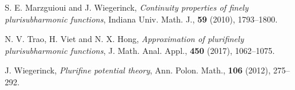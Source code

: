 \documentclass[3p,times]{elsarticle}
\numberwithin{equation}{section}
\newtheorem{The main theorem}[theorem]{The main theorem}
\theoremstyle{definition}
\begin{document}
\begin{thebibliography}{00}



 S. E. Marzguioui and J. Wiegerinck, {\em Continuity properties of finely plurisubharmonic functions}, Indiana Univ. Math. J., {\bf 59 }  (2010), 1793--1800.



 N. V. Trao, H. Viet and N. X. Hong, {\em Approximation of plurifinely plurisubharmonic functions}, J. Math. Anal. Appl.,  {\bf  450}  (2017),  1062--1075.

 J. Wiegerinck, {\em  Plurifine potential theory}, Ann. Polon. Math., {\bf 106} (2012), 275--292.


 \end{thebibliography}
\end{document}
